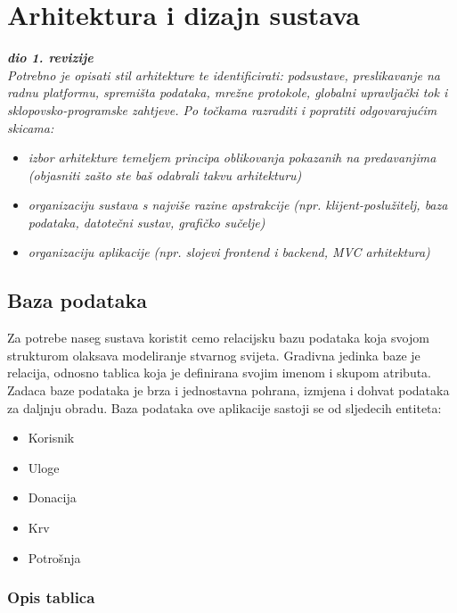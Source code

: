 \chapter{Arhitektura i dizajn sustava}
		
		\textbf{\textit{dio 1. revizije}}\\

		\textit{ Potrebno je opisati stil arhitekture te identificirati: podsustave, preslikavanje na radnu platformu, spremišta podataka, mrežne protokole, globalni upravljački tok i sklopovsko-programske zahtjeve. Po točkama razraditi i popratiti odgovarajućim skicama:}
	\begin{itemize}
		\item 	\textit{izbor arhitekture temeljem principa oblikovanja pokazanih na predavanjima (objasniti zašto ste baš odabrali takvu arhitekturu)}
		\item 	\textit{organizaciju sustava s najviše razine apstrakcije (npr. klijent-poslužitelj, baza podataka, datotečni sustav, grafičko sučelje)}
		\item 	\textit{organizaciju aplikacije (npr. slojevi frontend i backend, MVC arhitektura) }		
	\end{itemize}

	
		

		

				
		\section{Baza podataka}
			
			
			
		Za potrebe naseg sustava koristit cemo relacijsku bazu podataka koja svojom strukturom olaksava modeliranje stvarnog svijeta. Gradivna jedinka baze je relacija, odnosno tablica koja je definirana svojim imenom i skupom atributa. Zadaca baze podataka je brza i jednostavna pohrana, izmjena i dohvat podataka za daljnju obradu.
Baza podataka ove aplikacije sastoji se od sljedecih entiteta: 
\begin{itemize}
		\item Korisnik
		\item Uloge
		\item Donacija
		\item Krv
		\item Potrošnja
	\end{itemize}

		
			\subsection{Opis tablica}
			

